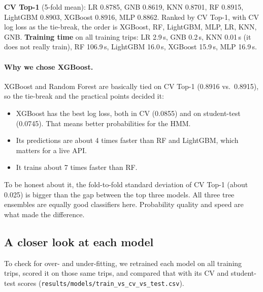 \documentclass[11pt,a4paper]{article}
\newcommand{\code}[1]{\texttt{\small #1}}
\begin{document}
\textbf{CV Top-1} (5-fold mean): LR 0.8785, GNB 0.8619, KNN 0.8701, RF 0.8915, LightGBM 0.8903,
XGBoost 0.8916, MLP 0.8862. Ranked by CV Top-1, with CV log loss as the tie-break, the order is XGBoost, RF,
LightGBM, MLP, LR, KNN, GNB.
\textbf{Training time} on all training trips: LR 2.9\,s, GNB 0.2\,s, KNN 0.01\,s (it does not really train),
RF 106.9\,s, LightGBM 16.0\,s, XGBoost 15.9\,s, MLP 16.9\,s.

\paragraph{Why we chose XGBoost.}
XGBoost and Random Forest are basically tied on CV Top-1 (0.8916 vs.\ 0.8915), so the tie-break and the
practical points decided it:
\begin{itemize}
  \item XGBoost has the best log loss, both in CV (0.0855) and on student-test (0.0745). That means better
        probabilities for the HMM.
  \item Its predictions are about 4 times faster than RF and LightGBM, which matters for a live API.
  \item It trains about 7 times faster than RF.
\end{itemize}
To be honest about it, the fold-to-fold standard deviation of CV Top-1 (about 0.025) is bigger than the gap
between the top three models. All three tree ensembles are equally good classifiers here. Probability quality
and speed are what made the difference.

\subsection{A closer look at each model}

To check for over- and under-fitting, we retrained each model on all training trips, scored it on those same
trips, and compared that with its CV and student-test scores (\code{results/models/train\_vs\_cv\_vs\_test.csv}).
\end{document}
